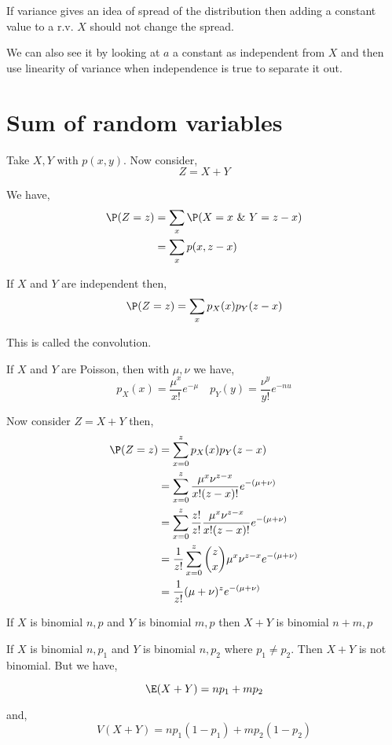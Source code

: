 \begin{remark}
	If variance gives an idea of spread of the distribution then adding a constant value to a r.v. $X$ should not change the spread. 
\end{remark}
\begin{remark}
	 We can also see it by looking at $a$ a constant as independent from $X$ and then use linearity of variance when independence is true to separate it out.
\end{remark}

\vspace{1em}

\section{Sum of random variables}
Take $X, Y$ with $p(x, y)$. Now consider, $$
	Z = X + Y
$$

We have, 
\begin{align*}
	\P(Z = z) &= \sum_x \P(X = x \text{ \& } Y = z - x) \\
		  &= \sum_x p(x, z - x)
\end{align*}

If $X$ and $Y$ are independent then, 
$$
	\P(Z = z) = \sum_x p_X(x) p_Y(z - x)
$$

This is called the convolution.


\begin{eg}
	If $X$ and $Y$ are Poisson, then with $\mu, \nu$ we have, 
	$$
		p_X(x) = \frac{\mu^{x}}{x!} e^{- \mu} \quad  p_Y(y) = \frac{\nu^{y}}{y!} e^{-nu}
	$$

	Now consider $Z = X + Y$ then, 
	\begin{align*}
		\P(Z= z) &= \sum_{x = 0}^{z} p_X(x) p_Y(z - x)\\
			 &= \sum_{x= 0}^{z} \frac{\mu^{x}\nu^{z - x}}{x! (z - x)!} e^{-(\mu + \nu)}\\
			 &= \sum_{x= 0}^{z} \frac{z!}{z!}\frac{\mu^{x}\nu^{z - x}}{x! (z - x)!} e^{-(\mu + \nu)}\\
			 &=\frac{1}{z!} \sum_{x= 0}^{z} {z \choose x} \mu^{x}\nu^{z - x} e^{-(\mu + \nu)}\\
			 &= \frac{1}{z!} (\mu + \nu)^{z} e^{-(\mu + \nu)}
	\end{align*}
\end{eg}
\begin{ex}
	If $X$ is binomial $n, p$ and $Y$ is binomial $m, p$ then $X + Y$ is binomial $n + m, p$ 
\end{ex}
\begin{remark}
	If $X$ is binomial $n, p_{1}$ and $Y$ is binomial $n, p_{2}$ where $p_{1} \ne p_{2}$. Then $X + Y$ is not binomial. But we have,

	$$
		\E(X + Y) = np_{1} + mp_{2}
	$$

	and, $$
	V(X + Y) = np_{1}(1 -p_{1}) + mp_{2}(1 - p_{2})
	$$
\end{remark}

